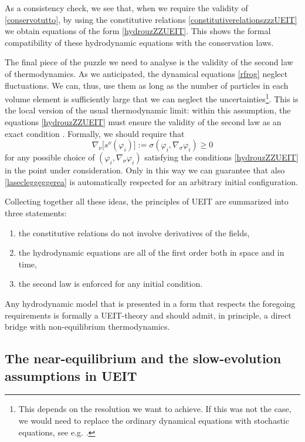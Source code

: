 \documentclass[a4paper, amsfonts, amssymb, amsmath, reprint, twocolumn, showkeys, nofootinbib]{revtex4-2}
\begin{document}
As a consistency check, we  see that, when we require the validity of \eqref{conservotutto}, by using the constitutive relations \eqref{constitutiverelationszzzUEIT} we obtain equations of the form \eqref{hydrouzZZUEIT}. This shows the formal compatibility of these hydrodynamic equations with the conservation laws.

The final piece of the puzzle we need to analyse is the validity of the second law of thermodynamics. As we anticipated, the dynamical equations \eqref{rfrog} neglect fluctuations. We can, thus, use them as long as the number of particles in each volume element is sufficiently large that we can neglect the uncertainties\footnote{
This depends on the resolution we want to achieve. If this was not the case, we would need to replace the ordinary dynamical equations with stochastic equations, see e.g. \citet{TorrieriCrooks2020}.
}.
This is the local version of the usual thermodynamic limit: within this assumption, the equations \eqref{hydrouzZZUEIT} must ensure the validity of the second law as an exact condition \citep{huang_book}. 
Formally, we should require that
\begin{equation}\label{Positto}
\nabla_\nu \big[ s^\nu(\varphi_i) \big] := \sigma (\varphi_i , \nabla_\sigma \varphi_i) \geq 0
\end{equation}
for any possible choice of $(\varphi_i , \nabla_\sigma \varphi_i)$ satisfying the conditions \eqref{hydrouzZZUEIT} in the point under consideration. Only in this way we can guarantee that also \eqref{lasecleggeggerea} is automatically respected \cite{Hishcock1983} for an arbitrary initial configuration. 

Collecting together all these ideas, the principles of UEIT are summarized into three statements:  
\begin{enumerate}
\item the constitutive relations do not involve derivatives of the fields,
\item the hydrodynamic equations are all of the first order both in space and in time,
\item the second law is enforced for any initial condition.
\end{enumerate}
Any hydrodynamic model that is presented in a form that respects the foregoing requirements is formally a UEIT-theory and should admit, in principle, a direct bridge with non-equilibrium thermodynamics.

\subsection{The near-equilibrium and the slow-evolution assumptions in UEIT}
\end{document}
